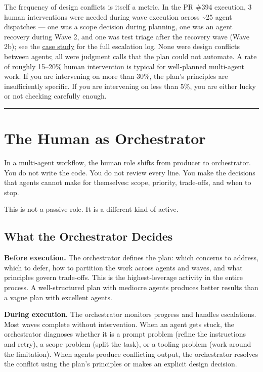 \documentclass[
  a4paper,
  DIV=11,
  numbers=noendperiod]{scrreprt}
\begin{document}
The frequency of design conflicts is itself a metric. In the PR \#394
execution, 3 human interventions were needed during wave execution
across \textasciitilde25 agent dispatches --- one was a scope decision
during planning, one was an agent recovery during Wave 2, and one was
test triage after the recovery wave (Wave 2b); see the
\href{../case-study-apm-overhaul.qmd}{case study} for the full
escalation log. None were design conflicts between agents; all were
judgment calls that the plan could not automate. A rate of roughly
15--20\% human intervention is typical for well-planned multi-agent
work. If you are intervening on more than 30\%, the plan's principles
are insufficiently specific. If you are intervening on less than 5\%,
you are either lucky or not checking carefully enough.

\begin{center}\rule{0.5\linewidth}{0.5pt}\end{center}

\section{The Human as Orchestrator}\label{the-human-as-orchestrator}

In a multi-agent workflow, the human role shifts from producer to
orchestrator. You do not write the code. You do not review every line.
You make the decisions that agents cannot make for themselves: scope,
priority, trade-offs, and when to stop.

This is not a passive role. It is a different kind of active.

\subsection{What the Orchestrator
Decides}\label{what-the-orchestrator-decides}

\textbf{Before execution.} The orchestrator defines the plan: which
concerns to address, which to defer, how to partition the work across
agents and waves, and what principles govern trade-offs. This is the
highest-leverage activity in the entire process. A well-structured plan
with mediocre agents produces better results than a vague plan with
excellent agents.

\textbf{During execution.} The orchestrator monitors progress and
handles escalations. Most waves complete without intervention. When an
agent gets stuck, the orchestrator diagnoses whether it is a prompt
problem (refine the instructions and retry), a scope problem (split the
task), or a tooling problem (work around the limitation). When agents
produce conflicting output, the orchestrator resolves the conflict using
the plan's principles or makes an explicit design decision.
\end{document}
